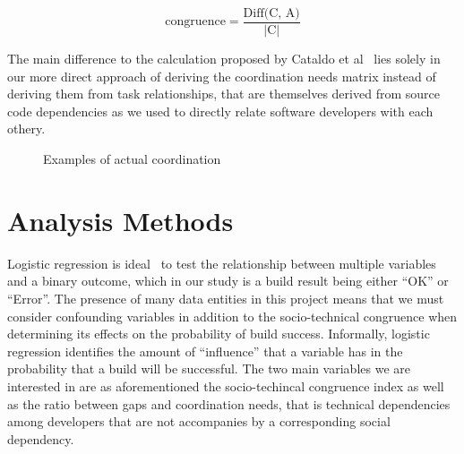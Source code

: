 \[ \text{congruence} = \frac{\text{Diff(C, A)}}  {|\text{C}|} \]

The main difference to the calculation proposed by Cataldo et al~\cite{cataldo:cscw:2006} lies solely in our more direct approach of deriving the coordination needs matrix instead of deriving them from task relationships, that are themselves derived from source code dependencies as we used to directly relate software developers with each othery.


\begin{figure}[t]
\centering
{}
\caption{Examples of actual coordination}
\label{ph:relationships}
\end{figure}


\section{Analysis Methods}
\label{sec:methodology}
Logistic regression is ideal~\cite{Sheskin2000} to test the relationship between multiple variables and a binary outcome, which in our study is a build result being either ``OK'' or ``Error''. The presence of many data entities in this project means that we must consider confounding variables in addition to the socio-technical congruence when determining its effects on the probability of build success. Informally, logistic regression identifies the amount of ``influence'' that a variable has in the probability that a build will be successful.
The two main variables we are interested in are as aforementioned the socio-techincal congruence index as well as the ratio between gaps and coordination needs, that is technical dependencies among developers that are not accompanies by a corresponding social dependency.

